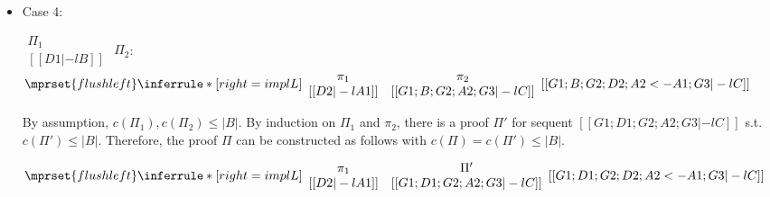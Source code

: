 \begin{itemize}
\item Case 4:
      \begin{center}
        \scriptsize
        \begin{math}
          \begin{array}{c}
            \Pi_1 \\
            {[[D1 |-l B]]}
          \end{array}
        \end{math}
        \qquad\qquad
        $\Pi_2$:
        \begin{math}
          $$\mprset{flushleft}
          \inferrule* [right={\tiny implL}] {
            {
              \begin{array}{cc}
                \pi_1 & \pi_2 \\
                {[[D2 |-l A1]]} & {[[G1; B; G2; A2; G3 |-l C]]}
              \end{array}
            }
          }{[[G1; B; G2; D2; A2 <- A1; G3 |-l C]]}
        \end{math}
      \end{center}
      By assumption, $c(\Pi_1),c(\Pi_2)\leq |B|$. By induction on $\Pi_1$
      and $\pi_2$, there is a proof $\Pi'$ for sequent
      $[[G1; D1; G2; A2; G3 |-l C]]$ s.t. $c(\Pi') \leq |B|$. Therefore,
      the proof $\Pi$ can be constructed as follows with
      $c(\Pi) = c(\Pi') \leq |B|$.
      \begin{center}
        \scriptsize
        \begin{math}
          $$\mprset{flushleft}
          \inferrule* [right={\tiny implL}] {
            {
              \begin{array}{cc}
                \pi_1 & \Pi' \\
                {[[D2 |-l A1]]} & {[[G1; D1; G2; A2; G3 |-l C]]}
              \end{array}
            }
          }{[[G1; D1; G2; D2; A2 <- A1; G3 |-l C]]}
        \end{math}
      \end{center}


\end{itemize}
